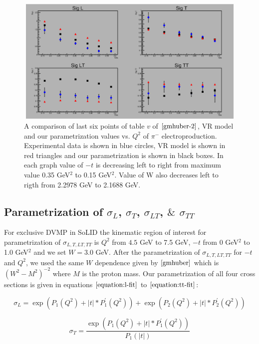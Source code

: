 \documentclass{article}
\begin{document}
\begin{figure}[!hbt]
    \centering
    \includegraphics[width=6.0in,height=2.4in]{pimsigma_qsq.eps}
    \caption{ A comparison of last six points of table $v$ of $\cite{gmhuber-2}$, VR model and our parametrization values vs. $Q^{2}$ 
    of $\pi^{-}$ electroproduction. Experimental data is shown in blue circles, VR model is shown in red triangles and our 
    parametrization is shown in black boxes. In each graph value of $-t$ is decreasing left to right from maximum value 0.35 GeV$^2$ 
    to 0.15 GeV$^2$. Value of W also decreases left to rigth from 2.2978 GeV to 2.1688 GeV.}
    \label{fig:expvrfit}
\end{figure}

\subsection{Parametrization of $\sigma_{L}$, $\sigma_{T}$, $\sigma_{LT}$, $\&$ $\sigma_{TT}$}
For exclusive DVMP in SoLID the kinematic region of interest for parametrization of $\sigma_{L,T,LT,TT}$ is $Q^2$ 
from $4.5$ GeV to 7.5 GeV, $-t$ from 0 GeV$^2$ to 1.0 GeV$^2$ and we set $W = 3.0$ GeV. After the parametrization of 
$\sigma_{L,T,LT,TT}$ for $-t$ and $Q^2$, we used the same $W$ dependence given by $\cite{gmhuber}$ which is $(W^2-M^2)^{-2}$ where
$M$ is the proton mass. Our parametrization of all four cross sections is given in equations $\ref{equation:l-fit}$ to 
$\ref{equation:tt-fit}$:

\begin{equation}
        \sigma_{L} = \exp{(P_1(Q^2) + |t| * P^{\prime}_1(Q^2))} + \exp{(P_2(Q^2) + |t| * P^{\prime}_2(Q^2))}
     \label{equation:l-fit}
\end{equation}

\begin{equation}
        \sigma_{T} =  \frac{\exp{(P_1(Q^2) + |t| * P^{\prime}_1(Q^2))}}{P_{1}(|t|)}
     \label{equation:t-fit}
\end{equation}
\end{document}
